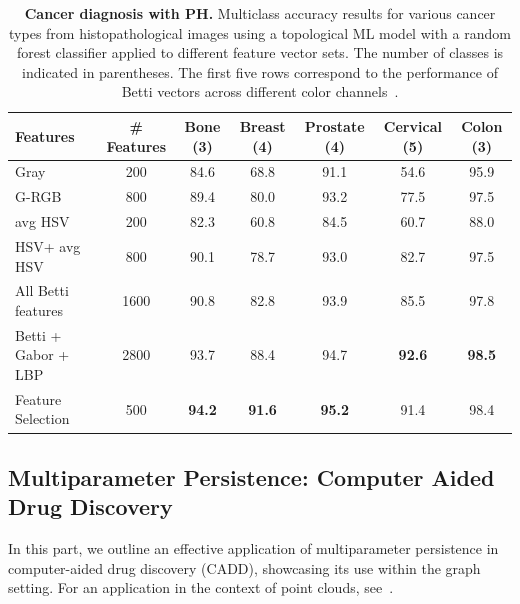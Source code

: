 \begin{table}[h!]
\centering
\caption{{\bf Cancer diagnosis with PH.} Multiclass accuracy results for various cancer types from histopathological images using a topological ML model with a random forest classifier applied to different feature vector sets. The number of classes is indicated in parentheses. The first five rows correspond to the performance of Betti vectors across different color channels~\cite{yadav2023histopathological}. \label{tab:histopathology}}
\setlength\tabcolsep{3pt}
\begin{tabular}{lcccccc}
\toprule
\textbf{Features} & \textbf{\# Features} &  \textbf{Bone} (3) &   \textbf{Breast} (4)&   \textbf{Prostate} (4)&   \textbf{Cervical} (5)&   \textbf{Colon} (3)\\
    \midrule
Gray & 200               	&	84.6	&	68.8	&	91.1	&	54.6	&	 95.9 \\	
G-RGB & 800               	&	89.4	&	80.0	&	93.2	&	77.5	&	 97.5 \\	
avg HSV &200            	&	82.3	&	60.8	&	84.5	&	60.7	&	 88.0 \\	
HSV+ avg HSV & 800         	&	90.1	&	78.7	&	93.0	&	82.7	&	 97.5 \\	
All Betti features &1600 	&	90.8	&	82.8	&	93.9	&	85.5	&	 97.8  \\	
Betti + Gabor + LBP & 2800       	&	93.7	&	88.4	&	94.7	&	\textbf{92.6}	&	 \textbf{98.5} \\ \midrule	
Feature Selection  & 500    &	\textbf{94.2}	&	\textbf{91.6}	&	\textbf{95.2}	&	91.4	&	 98.4 \\ \bottomrule	
\end{tabular}
\end{table}








\subsection{Multiparameter Persistence: Computer Aided Drug Discovery} \label{sec:drug}

 

In this part, we outline an effective application of multiparameter persistence in computer-aided drug discovery (CADD), showcasing its use within the graph setting. For an application in the context of point clouds, see~\cite{vipond2021multiparameter, carriere2020multiparameter, loiseaux2024stable}.

